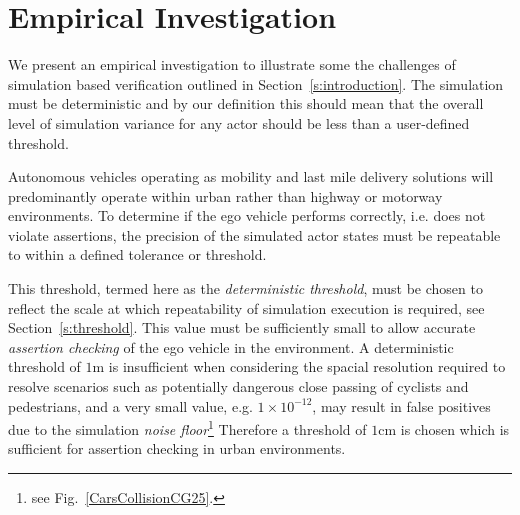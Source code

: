 \documentclass[letterpaper, 10 pt, journal, twoside]{IEEEtran}
\begin{document}
\section{Empirical Investigation} \label{s:case-study}
We present an empirical investigation to illustrate some the challenges of simulation based verification outlined in Section~\ref{s:introduction}. The simulation must be deterministic and by our definition this should mean that the overall level of simulation variance %
for any actor should be less than a user-defined threshold. 


Autonomous vehicles operating as mobility and last mile delivery solutions will predominantly operate within urban rather than highway or motorway environments. To determine if the ego vehicle performs correctly, i.e. does not violate assertions, the precision of the simulated actor states must be repeatable to within a defined tolerance or threshold.

This threshold, termed here as the \textit{deterministic threshold}, must be chosen to reflect the scale at which repeatability of simulation execution is required, see Section~\ref{s:threshold}. This value must be sufficiently small to allow accurate \textit{assertion checking} of the ego vehicle in the environment.
%
%
A deterministic threshold of $1$m is insufficient when considering the spacial resolution required to resolve scenarios such as potentially dangerous close passing of cyclists and pedestrians, and a very small value, e.g. $1\times10^{-12}$, may result in false positives due to the simulation \textit{noise floor}\footnote{see Fig.~\ref{CarsCollisionCG25}.} Therefore a threshold of $1$cm is chosen which is sufficient for assertion checking in urban environments. 
%
\end{document}
